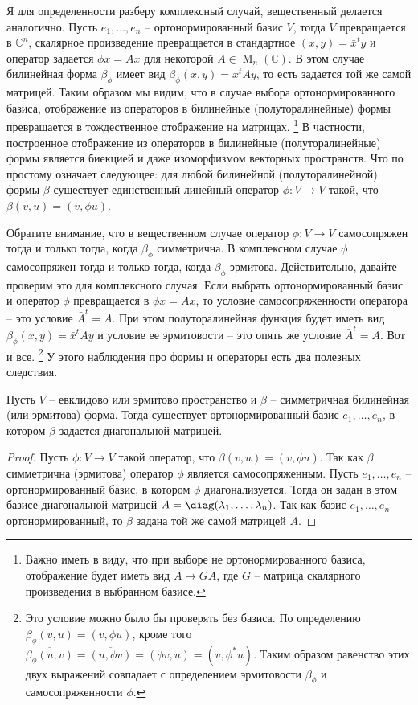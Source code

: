 Я для определенности разберу комплексный случай, вещественный делается аналогично.
Пусть $e_1,\ldots,e_n$ -- ортонормированный базис $V$, тогда $V$ превращается в $\mathbb C^n$, скалярное произведение превращается в стандартное $(x, y) = \bar x^t y$ и оператор задается $\phi x = Ax$ для некоторой $A\in \operatorname{M}_n(\mathbb C)$.
В этом случае билинейная форма $\beta_\phi$ имеет вид $\beta_\phi(x,y) = \bar x^t A y$, то есть задается той же самой матрицей.
Таким образом мы видим, что в случае выбора ортонормированного базиса, отображение из операторов в билинейные (полуторалинейные) формы превращается в тождественное отображение на матрицах.%
\footnote{Важно иметь в виду, что при выборе не ортонормированного базиса, отображение будет иметь вид $A\mapsto G A$, где $G$ -- матрица скалярного произведения в выбранном базисе.}
В частности, построенное отображение из операторов в билинейные (полуторалинейные) формы является биекцией и даже изоморфизмом векторных пространств.
Что по простому означает следующее: для любой билинейной (полуторалинейной) формы $\beta$ существует единственный линейный оператор $\phi\colon V\to V$ такой, что $\beta(v,u) = (v, \phi u)$.

Обратите внимание, что в вещественном случае оператор $\phi\colon V\to V$ самосопряжен тогда и только тогда, когда $\beta_\phi$ симметрична.
В комплексном случае $\phi$ самосопряжен тогда и только тогда, когда $\beta_\phi$ эрмитова.
Действительно, давайте проверим это для комплексного случая.
Если выбрать ортонормированный базис и оператор $\phi$ превращается в $\phi x = A x$, то условие самосопряженности оператора -- это условие $\bar A^t = A$.
При этом полуторалинейная функция будет иметь вид $\beta_\phi(x, y) = \bar x^t A y$ и условие ее эрмитовости -- это опять же условие $\bar A^t = A$.
Вот и все.%
\footnote{Это условие можно было бы проверять без базиса.
По определению $\beta_\phi(v, u) = (v, \phi u)$, кроме того $\overline{\beta_\phi(u, v)} = \overline{(u, \phi v)} = (\phi v, u) = (v, \phi^* u)$.
Таким образом равенство этих двух выражений совпадает с определением эрмитовости $\beta_\phi$ и самосопряженности $\phi$.}
У этого наблюдения про формы и операторы есть два полезных следствия.

\begin{claim}
\label{claim::BilinOrthoDiag}
Пусть $V$ -- евклидово или эрмитово пространство и $\beta$ -- симметричная билинейная (или эрмитова) форма.
Тогда существует ортонормированный базис $e_1,\ldots,e_n$, в котором $\beta$ задается диагональной матрицей.
\end{claim}
\begin{proof}
Пусть $\phi\colon V\to V$ такой оператор, что $\beta(v, u) = (v, \phi u)$.
Так как $\beta$ симметрична (эрмитова) оператор $\phi$ является самосопряженным.
Пусть $e_1,\ldots,e_n$ -- ортонормированный базис, в котором $\phi$ диагонализуется.
Тогда он задан в этом базисе диагональной матрицей $A = \diag(\lambda_1,\ldots,\lambda_n)$.
Так как базис $e_1,\ldots,e_n$ ортонормированный, то $\beta$ задана той же самой матрицей $A$.
\end{proof}


